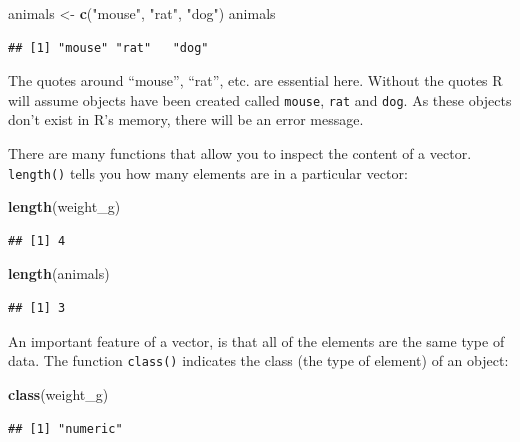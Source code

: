 \documentclass[]{book}
\newenvironment{Shaded}{\begin{snugshade}}{\end{snugshade}}
\newcommand{\KeywordTok}[1]{\textcolor[rgb]{0.13,0.29,0.53}{\textbf{#1}}}
\newcommand{\NormalTok}[1]{#1}
\newcommand{\StringTok}[1]{\textcolor[rgb]{0.31,0.60,0.02}{#1}}
\begin{document}
\begin{Shaded}
\begin{Highlighting}[]
\NormalTok{animals <-}\StringTok{ }\KeywordTok{c}\NormalTok{(}\StringTok{"mouse"}\NormalTok{, }\StringTok{"rat"}\NormalTok{, }\StringTok{"dog"}\NormalTok{)}
\NormalTok{animals}
\end{Highlighting}
\end{Shaded}

\begin{verbatim}
## [1] "mouse" "rat"   "dog"
\end{verbatim}

The quotes around ``mouse'', ``rat'', etc. are essential here. Without the quotes R will assume objects have been created called \texttt{mouse}, \texttt{rat} and \texttt{dog}. As these objects don't exist in R's memory, there will be an error message.

There are many functions that allow you to inspect the content of a vector. \texttt{length()} tells you how many elements are in a particular vector:

\begin{Shaded}
\begin{Highlighting}[]
\KeywordTok{length}\NormalTok{(weight_g)}
\end{Highlighting}
\end{Shaded}

\begin{verbatim}
## [1] 4
\end{verbatim}

\begin{Shaded}
\begin{Highlighting}[]
\KeywordTok{length}\NormalTok{(animals)}
\end{Highlighting}
\end{Shaded}

\begin{verbatim}
## [1] 3
\end{verbatim}

An important feature of a vector, is that all of the elements are the same type of data. The function \texttt{class()} indicates the class (the type of element) of an object:

\begin{Shaded}
\begin{Highlighting}[]
\KeywordTok{class}\NormalTok{(weight_g)}
\end{Highlighting}
\end{Shaded}

\begin{verbatim}
## [1] "numeric"
\end{verbatim}
\end{document}
